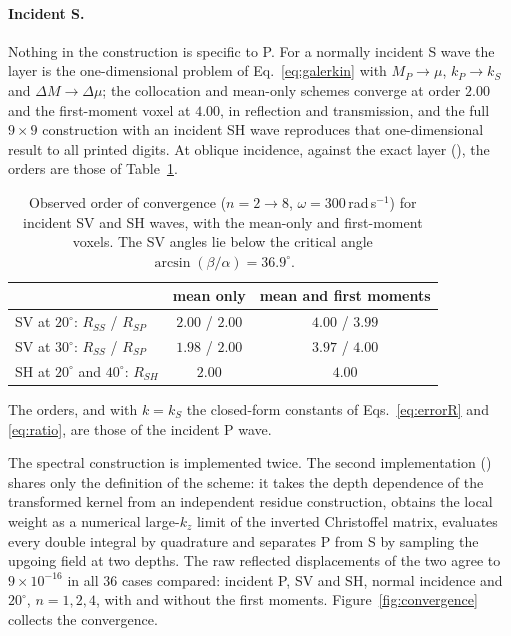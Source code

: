 \documentclass[extra,mreferee]{gji}
\begin{document}
\paragraph{Incident S.} Nothing in the construction is specific to P. For a normally incident S wave
the layer is the one-dimensional problem of Eq.~\eqref{eq:galerkin} with $M_P\to\mu$, $k_P\to k_S$ and
$\Delta M\to\Delta\mu$; the collocation and mean-only schemes converge at order $2.00$ and the
first-moment voxel at $4.00$, in reflection and transmission, and the full $9\times9$ construction
with an incident SH wave reproduces that one-dimensional result to all printed digits. At oblique
incidence, against the exact layer (), the orders are those of
Table~\ref{tab:incS}.
\begin{table}
\centering
\caption{Observed order of convergence ($n=2\to8$, $\omega=300$\,rad\,s$^{-1}$) for incident SV and SH waves, with the mean-only and first-moment voxels. The SV angles lie below the critical angle $\arcsin(\beta/\alpha)=36.9^\circ$.}\label{tab:incS}
\small
\begin{tabular}{@{}lcc@{}}
\toprule
 & mean only & mean and first moments \\
\midrule
SV at $20^\circ$: $R_{SS}$ / $R_{SP}$ & $2.00$ / $2.00$ & $4.00$ / $3.99$ \\
SV at $30^\circ$: $R_{SS}$ / $R_{SP}$ & $1.98$ / $2.00$ & $3.97$ / $4.00$ \\
SH at $20^\circ$ and $40^\circ$: $R_{SH}$ & $2.00$ & $4.00$ \\
\bottomrule
\end{tabular}
\end{table}
The orders, and with $k=k_S$ the closed-form constants of
Eqs.~\eqref{eq:errorR} and \eqref{eq:ratio}, are those of the incident P wave.

The spectral construction is implemented twice. The second implementation
() shares only the definition of the scheme: it takes
the depth dependence of the transformed kernel from an independent residue construction, obtains
the local weight as a numerical large-$k_z$ limit of the inverted Christoffel matrix, evaluates every
double integral by quadrature and separates P from S by sampling the upgoing field at two depths.
The raw reflected displacements of the two agree to $9\times10^{-16}$ in all $36$ cases compared:
incident P, SV and SH, normal incidence and $20^\circ$, $n=1,2,4$, with and without the first moments.
Figure~\ref{fig:convergence} collects the convergence.
\end{document}
